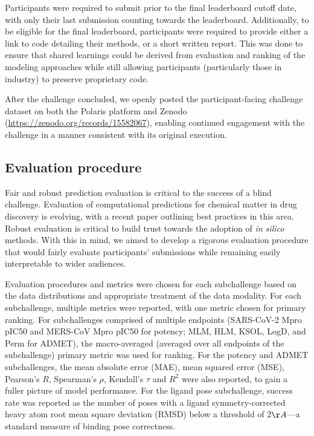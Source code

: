 \documentclass[journal=jcim,manuscript=article]{achemso}
\begin{document}
Participants were required to submit prior to the final leaderboard cutoff date, with only their last submission counting towards the leaderboard. Additionally, to be eligible for the final leaderboard, participants were required to provide either a link to code detailing their methods, or a short written report. This was done to ensure that shared learnings could be derived from evaluation and ranking of the modeling approaches while still allowing participants (particularly those in industry) to preserve proprietary code. 

After the challenge concluded, we openly posted the participant-facing challenge dataset on both the Polaris platform and Zenodo (\url{https://zenodo.org/records/15582067}), enabling continued engagement with the challenge in a manner consistent with its original execution.


\subsection{Evaluation procedure}    

Fair and robust prediction evaluation is critical to the success of a blind challenge\cite{sampl6_2018}. Evaluation of computational predictions for chemical matter in drug discovery is evolving, with a recent paper outlining best practices in this area\cite{ash_practically_2024}. Robust evaluation is critical to build trust towards the adoption of \textit{in silico} methods. With this in mind, we aimed to develop a rigorous evaluation procedure that would fairly evaluate participants' submissions while remaining easily interpretable to wider audiences.

Evaluation procedures and metrics were chosen for each subchallenge based on the data distributions and appropriate treatment of the data modality. For each subchallenge, multiple metrics were reported, with one metric chosen for primary ranking. For subchallenges comprised of multiple endpoints (SARS-CoV-2 Mpro pIC50 and MERS-CoV Mpro pIC50 for potency; MLM, HLM, KSOL, LogD, and Perm for ADMET), the macro-averaged (averaged over all endpoints of the subchallenge) primary metric was used for ranking. For the potency and ADMET subchallenges, the mean absolute error (MAE), mean squared error (MSE), Pearson's $R$, Spearman's $\rho$, Kendall's $\tau$ and $R^2$ were also reported, to gain a fuller picture of model performance. For the ligand pose subchallenge, success rate was reported as the number of poses with a ligand symmetry-corrected heavy atom root mean square deviation (RMSD) below a threshold of 2$\AA$---a standard measure of binding pose correctness.\cite{wagner_churas_liu_swift_chiu_shao_feher_burley_gilson_amaro_2019}
\end{document}
